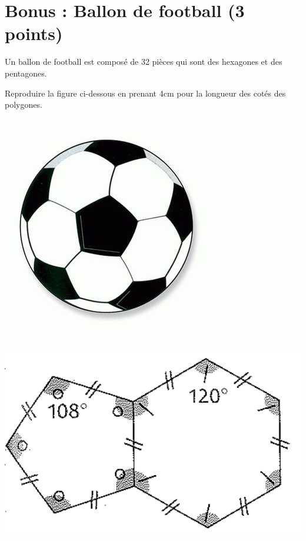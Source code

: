 \section*{Bonus : Ballon de football (3 points)}
Un ballon de football est composé de 32 pièces qui sont des hexagones et des pentagones.

\begin{questions}
	\question[3] Reproduire la figure ci-dessous en prenant 4cm pour la longueur des cotés des polygones.
\end{questions}

\begin{multicols}{2}
	\begin{center}
		\includegraphics[scale=0.35]{img/foot1}
	\end{center}

	\begin{center}
		\includegraphics[scale=0.5]{img/foot2}
	\end{center}
\end{multicols}
